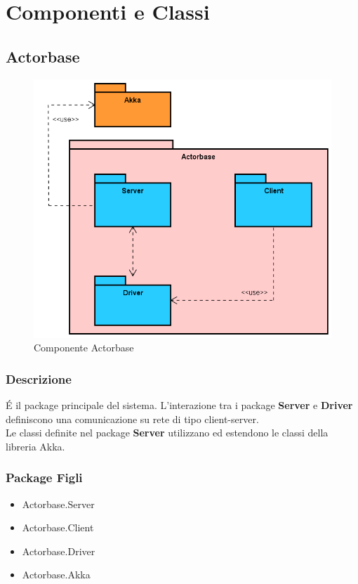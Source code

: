 \documentclass[a4paper]{article}
\begin{document}
	\newpage 
	\section{Componenti e Classi}
		\subsection{Actorbase}
			\begin{figure} [H]
			\centering
			\includegraphics[scale=0.50]{Server/Package/actorbase.png}
			\caption{Componente Actorbase}
		\end{figure}
			\subsubsection{Descrizione}
				\'E il package principale del sistema. L'interazione tra i package \textbf{Server} e \textbf{Driver} definiscono una comunicazione su rete di tipo client-server. \\ Le classi definite nel package \textbf{Server} utilizzano ed estendono le classi della libreria Akka.
			\subsubsection{Package Figli}
				\begin{itemize}
					\item Actorbase.Server
					\item Actorbase.Client
					\item Actorbase.Driver
					\item Actorbase.Akka
				\end{itemize}
\end{document}
